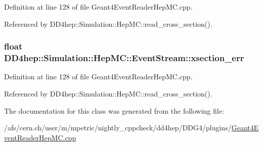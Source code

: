Definition at line 128 of file Geant4EventReaderHepMC.cpp.

Referenced by DD4hep::Simulation::HepMC::read\_\-cross\_\-section().\hypertarget{class_d_d4hep_1_1_simulation_1_1_hep_m_c_1_1_event_stream_ab2ad757474584ec785c50c36181b2ae2}{
\subsubsection[{xsection\_\-err}]{\setlength{\rightskip}{0pt plus 5cm}float {\bf DD4hep::Simulation::HepMC::EventStream::xsection\_\-err}}}
\label{class_d_d4hep_1_1_simulation_1_1_hep_m_c_1_1_event_stream_ab2ad757474584ec785c50c36181b2ae2}


Definition at line 128 of file Geant4EventReaderHepMC.cpp.

Referenced by DD4hep::Simulation::HepMC::read\_\-cross\_\-section().

The documentation for this class was generated from the following file:\begin{DoxyCompactItemize}
\item 
/afs/cern.ch/user/m/mpetric/nightly\_\-cppcheck/dd4hep/DDG4/plugins/\hyperlink{_geant4_event_reader_hep_m_c_8cpp}{Geant4EventReaderHepMC.cpp}\end{DoxyCompactItemize}
